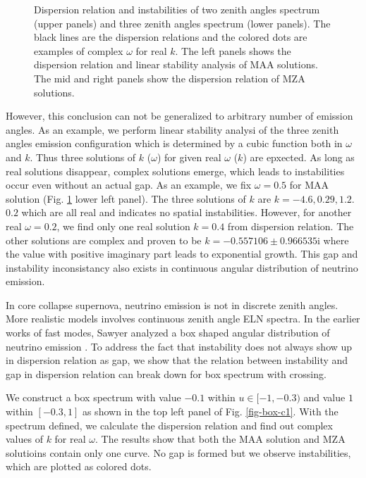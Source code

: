 \documentclass[%
preprint,
 amsmath,amssymb,
 aps,
 prd
]{revtex4-1}
\begin{document}
\begin{figure}[!htb]
\endminipage\hfill
\caption{Dispersion relation and instabilities of two zenith angles spectrum (upper panels) and three zenith angles spectrum (lower panels). The black lines are the dispersion relations and the colored dots are examples of complex $\omega$ for real $k$. The left panels shows the dispersion relation and linear stability analysis of MAA solutions. The mid and right panels show the dispersion relation of MZA solutions.}
\label{fig-dr-db}
\end{figure}


However, this conclusion can not be generalized to arbitrary number of emission angles. As an example, we perform linear stability analysi of the three zenith angles emission configuration which is determined by a cubic function both in $\omega$ and $k$. Thus three solutions of $k$ ($\omega$) for given real $\omega$ ($k$) are epxected. As long as real solutions disappear, complex solutions emerge, which leads to instabilities occur even without an actual gap. As an example, we fix $\omega= 0.5$ for MAA solution (Fig. \ref{fig-dr-db} lower left panel). The three solutions of $k$ are $k=-4.6, 0.29, 1.2$.  $0.2$ which are all real and indicates no spatial instabilities. However, for another real $\omega = 0.2$, we find only one real solution $k=0.4$ from dispersion relation. The other solutions are complex and proven to be $k = -0.557106\pm 0.966535\mathrm i$ where the value with positive imaginary part leads to exponential growth. This gap and instability inconsistancy also exists in continuous angular distribution of neutrino emission.



In core collapse supernova, neutrino emission is not in discrete zenith angles. More realistic models involves continuous zenith angle ELN spectra. In the earlier works of fast modes, Sawyer analyzed a box shaped angular distribution of neutrino emission \cite{Sawyer2016}. To address the fact that instability does not always show up in dispersion relation as gap, we show that the relation between instability and gap in dispersion relation can break down for box spectrum with crossing.



We construct a box spectrum with value $-0.1$ within $u\in [-1,-0.3)$ and value $1$ within $[-0.3,1]$ as shown in the top left panel of Fig. \ref{fig-box-c1}. With the spectrum defined, we calculate the dispersion relation and find out complex values of $k$ for real $\omega$. The results show that both the MAA solution and MZA solutioins contain only one curve. No gap is formed but we observe instabilities, which are plotted as colored dots.
\end{document}
